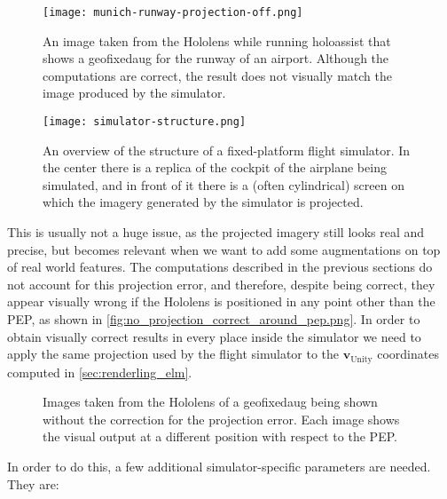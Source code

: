 \begin{figure}
  \centering
  \texttt{[image: munich-runway-projection-off.png]}
  \caption{An image taken from the Hololens while running \gls{holoassist} that shows a \gls{geofixedaug} for the runway of an airport. Although the computations are correct, the result does not visually match the image produced by the simulator.}\label{fig:no_projection_is_wrong.png}
\end{figure}

\begin{figure}
  \centering
  \texttt{[image: simulator-structure.png]}
  \caption{An overview of the structure of a fixed-platform flight simulator. In the center there is a replica of the cockpit of the airplane being simulated, and in front of it there is a (often cylindrical) screen on which the imagery generated by the simulator is projected.}\label{fig:sim_structure.png}
\end{figure}

This is usually not a huge issue, as the projected imagery still looks real and precise, but becomes relevant when we want to add some augmentations on top of real world features. The computations described in the previous sections do not account for this projection error, and therefore, despite being correct, they appear visually wrong if the Hololens is positioned in any point other than the \gls{PEP}, as shown in \autoref{fig:no_projection_correct_around_pep.png}. In order to obtain visually correct results in every place inside the simulator we need to apply the same projection used by the flight simulator to the $\mathbf{v}_{\text{Unity}}$ coordinates computed in \autoref{sec:renderling_elm}.

\begin{figure}
  \centering
  \hfill
  \caption{Images taken from the Hololens of a \gls{geofixedaug} being shown without the correction for the projection error. Each image shows the visual output at a different position with respect to the \gls{PEP}.}
\label{fig:no_projection_correct_around_pep.png}
\end{figure}

In order to do this, a few additional simulator-specific parameters are needed. They are:

